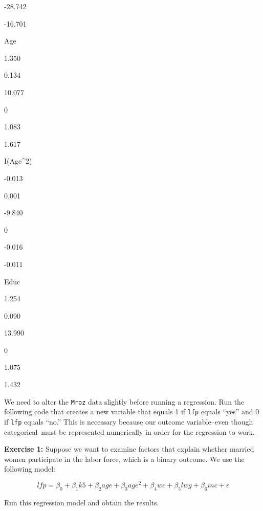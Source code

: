 \documentclass[
]{book}
\newenvironment{Shaded}{\begin{snugshade}}{\end{snugshade}}
\newcommand{\DataTypeTok}[1]{\textcolor[rgb]{0.13,0.29,0.53}{#1}}
\newcommand{\DecValTok}[1]{\textcolor[rgb]{0.00,0.00,0.81}{#1}}
\newcommand{\KeywordTok}[1]{\textcolor[rgb]{0.13,0.29,0.53}{\textbf{#1}}}
\newcommand{\NormalTok}[1]{#1}
\newcommand{\OperatorTok}[1]{\textcolor[rgb]{0.81,0.36,0.00}{\textbf{#1}}}
\newcommand{\StringTok}[1]{\textcolor[rgb]{0.31,0.60,0.02}{#1}}
\newenvironment{learncheck}%
{%
  \par\vspace{\baselineskip}\noindent 
  \color{Exercise}\begin{itshape}%
  \par\vspace{\baselineskip}\noindent\ignorespaces 
}%
{%
  \end{itshape}\ignorespacesafterend 
}
\begin{document}
-28.742

-16.701

Age

1.350

0.134

10.077

0

1.083

1.617

I(Age\^{}2)

-0.013

0.001

-9.840

0

-0.016

-0.011

Educ

1.254

0.090

13.990

0

1.075

1.432

We need to alter the \texttt{Mroz} data slightly before running a regression. Run the following code that creates a new variable that equals 1 if \texttt{lfp} equals ``yes'' and 0 if \texttt{lfp} equals ``no.'' This is necessary because our outcome variable--even though categorical--must be represented numerically in order for the regression to work.

\begin{Shaded}
\end{Shaded}

\begin{learncheck}
\textbf{Exercise 1:} Suppose we want to examine factors that explain
whether married women participate in the labor force, which is a binary
outcome. We use the following model:

\begin{equation}
lfp = \beta_0 + \beta_1k5 + \beta_2age + \beta_3age^2 + \beta_4wc + \beta_5lwg + \beta_6inc + \epsilon
\end{equation}

Run this regression model and obtain the results.
\end{learncheck}
\end{document}
